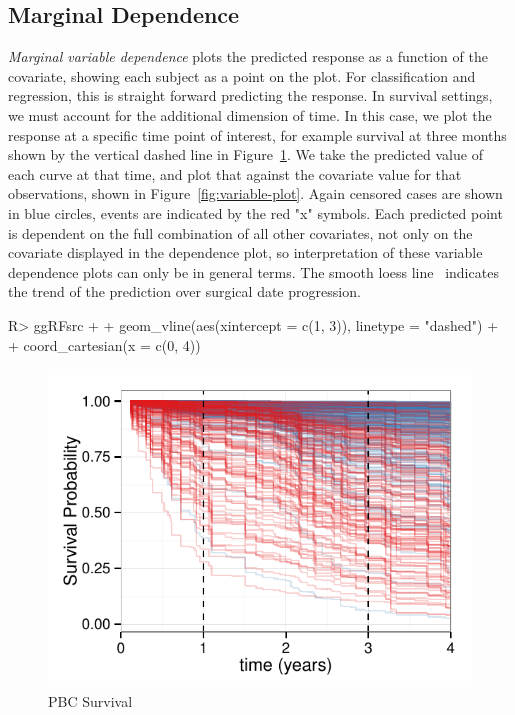 \documentclass[nojss]{jss}\usepackage[]{graphicx}\usepackage[]{color}
\makeatletter
\def\maxwidth{ %
  \ifdim\Gin@nat@width>\linewidth
    \linewidth
  \else
    \Gin@nat@width
  \fi
}
\makeatother
\begin{document}
\subsection{Marginal Dependence}\label{S:variableDependence}
\emph{Marginal variable dependence} plots the predicted response as a function of the covariate, showing each subject as a point on the plot. For classification and regression, this is straight forward predicting the response. In survival settings, we must account for the additional dimension of time. In this case, we plot the response at a specific time point of interest, for example survival at three months shown by the vertical dashed line in Figure~\ref{fig:rfsrc-plot3Mnth}. We take the predicted value of each curve at that time, and plot that against the covariate value for that observations, shown in Figure~\ref{fig:variable-plot}. Again censored cases are shown in blue circles, events are indicated by the red "x" symbols. Each predicted point is dependent on the full combination of all other covariates, not only on the covariate displayed in the dependence plot, so interpretation of these variable dependence plots can only be in general terms. The smooth loess line~\citep{cleveland:1981, cleveland:1988} indicates the trend of the prediction over surgical date progression.

\begin{Schunk}
\begin{Sinput}
R> ggRFsrc + 
+   geom_vline(aes(xintercept = c(1, 3)), linetype = "dashed") + 
+   coord_cartesian(x = c(0, 4))
\end{Sinput}
\begin{figure}[!htpb]

{\centering \includegraphics[width=\maxwidth]{figure/rfs-rfsrc-plot3Mnth-1} 

}

\caption[PBC Survival]{PBC Survival\label{fig:rfsrc-plot3Mnth}}
\end{figure}
\end{Schunk}
\end{document}
